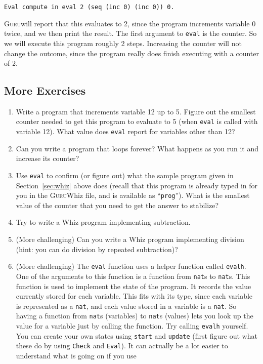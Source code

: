 \documentclass{book}[12pt]
\newcommand{\guru}[0]{\textsc{Guru}}
\begin{document}
\begin{verbatim}
Eval compute in eval 2 (seq (inc 0) (inc 0)) 0.
\end{verbatim}

\noindent \guru will report that this evaluates to 2, since the program
increments variable $0$ twice, and we then print the result.  The
first argument to \texttt{eval} is the counter.  So we will execute
this program roughly 2 steps.  Increasing the counter will not change
the outcome, since the program really does finish executing with a
counter of 2.  

\subsection{More Exercises}

\begin{enumerate}
\item Write a program that increments variable 12 up to 5.  Figure out
the smallest counter needed to get this program to evaluate to 5 (when
\texttt{eval} is called with variable 12).  What value does \texttt{eval}
report for variables other than 12?

\item Can you write a program that loops forever?  What happens as
you run it and increase its counter?

\item Use \texttt{eval} to confirm (or figure out) what the sample
program given in Section~\ref{sec:whiz} above does (recall that this
program is already typed in for you in the \guru Whiz file, and is
available as ``\texttt{prog}'').  What is the smallest value of the
counter that you need to get the answer to stabilize?

\item Try to write a Whiz program implementing subtraction.

\item (More challenging) Can you write a Whiz program implementing
division (hint: you can do division by repeated subtraction)?

\item (More challenging) The \texttt{eval} function uses a helper
function called \texttt{evalh}.  One of the arguments to this function
is a function from \texttt{nat}s to \texttt{nat}s.  This function is
used to implement the state of the program.  It records the value
currently stored for each variable.  This fits with its type, since
each variable is represented as a \texttt{nat}, and each value stored
in a variable is a \texttt{nat}.  So having a function from
\texttt{nat}s (variables) to \texttt{nat}s (values) lets you look up
the value for a variable just by calling the function.  Try calling
\texttt{evalh} yourself.  You can create your own states using
\texttt{start} and \texttt{update} (first figure out what these do by
using \texttt{Check} and \texttt{Eval}).  It can actually be a lot
easier to understand what is going on if you use


\end{enumerate}
\end{document}

